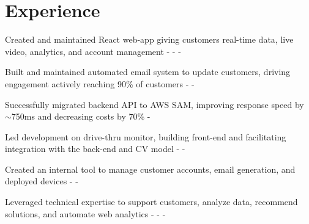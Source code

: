 \documentclass[]{plushcv}
\begin{document}
\begin{minipage}[t]{0.25\textwidth}
    
    
    \end{minipage} 
\hfill
\begin{minipage}[t]{0.7\textwidth} 



\section{Experience}
\vspace{\topsep} %
\begin{tightemize}
\sectionsep
\item Created and maintained React web-app giving customers real-time data, 
live video, analytics, and account management \react - \python - \gcp - \sql \\
\item Built and maintained automated email system to update customers, 
driving engagement actively reaching 90\% of customers \python - \sql - \gcp  \\
\item Successfully migrated backend API to AWS SAM, improving response speed by
 $\sim$750ms and decreasing costs by 70\% \aws - \gcp \\
\item Led development on drive-thru monitor, building front-end and facilitating
 integration with the back-end and CV model \react - \python - \docker \\
\item Created an internal tool to manage customer accounts, email generation,
 and deployed devices \react - \python - \gcp \\
\item Leveraged technical expertise to support customers, analyze data, 
recommend solutions, and automate web analytics \react - \dthree - \sql - \python \\
\end{tightemize}
\sectionsep


\end{minipage}
\end{document}
